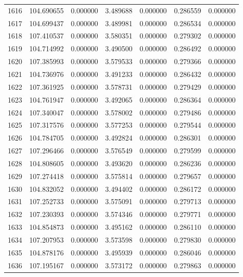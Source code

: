 \begin{tabular}{rrrrrrr}
1616 & 104.690655 &    0.000000 &  3.489688 &    0.000000 &    0.286559 &  0.000000 \\
1617 & 104.699437 &    0.000000 &  3.489981 &    0.000000 &    0.286534 &  0.000000 \\
1618 & 107.410537 &    0.000000 &  3.580351 &    0.000000 &    0.279302 &  0.000000 \\
1619 & 104.714992 &    0.000000 &  3.490500 &    0.000000 &    0.286492 &  0.000000 \\
1620 & 107.385993 &    0.000000 &  3.579533 &    0.000000 &    0.279366 &  0.000000 \\
1621 & 104.736976 &    0.000000 &  3.491233 &    0.000000 &    0.286432 &  0.000000 \\
1622 & 107.361925 &    0.000000 &  3.578731 &    0.000000 &    0.279429 &  0.000000 \\
1623 & 104.761947 &    0.000000 &  3.492065 &    0.000000 &    0.286364 &  0.000000 \\
1624 & 107.340047 &    0.000000 &  3.578002 &    0.000000 &    0.279486 &  0.000000 \\
1625 & 107.317576 &    0.000000 &  3.577253 &    0.000000 &    0.279544 &  0.000000 \\
1626 & 104.784705 &    0.000000 &  3.492824 &    0.000000 &    0.286301 &  0.000000 \\
1627 & 107.296466 &    0.000000 &  3.576549 &    0.000000 &    0.279599 &  0.000000 \\
1628 & 104.808605 &    0.000000 &  3.493620 &    0.000000 &    0.286236 &  0.000000 \\
1629 & 107.274418 &    0.000000 &  3.575814 &    0.000000 &    0.279657 &  0.000000 \\
1630 & 104.832052 &    0.000000 &  3.494402 &    0.000000 &    0.286172 &  0.000000 \\
1631 & 107.252733 &    0.000000 &  3.575091 &    0.000000 &    0.279713 &  0.000000 \\
1632 & 107.230393 &    0.000000 &  3.574346 &    0.000000 &    0.279771 &  0.000000 \\
1633 & 104.854873 &    0.000000 &  3.495162 &    0.000000 &    0.286110 &  0.000000 \\
1634 & 107.207953 &    0.000000 &  3.573598 &    0.000000 &    0.279830 &  0.000000 \\
1635 & 104.878176 &    0.000000 &  3.495939 &    0.000000 &    0.286046 &  0.000000 \\
1636 & 107.195167 &    0.000000 &  3.573172 &    0.000000 &    0.279863 &  0.000000 \\

\end{tabular}

